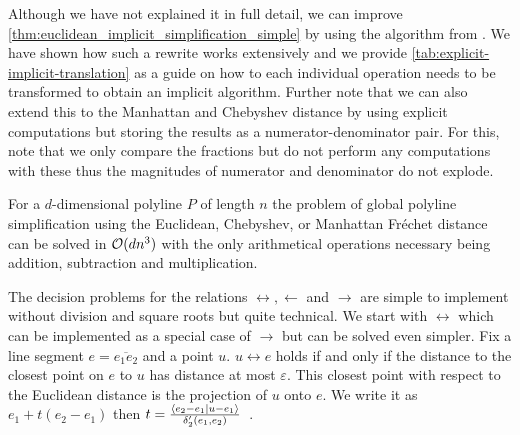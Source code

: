 Although we have not explained it in full detail, we can improve \cref{thm:euclidean_implicit_simplification_simple} by using the algorithm from \citeauthor{polyline_simplification_has_cubic_complexity_bringmannetal}. We have shown how such a rewrite works extensively and we provide \cref{tab:explicit-implicit-translation} as a guide on how to each individual operation needs to be transformed to obtain an implicit algorithm.  
Further note that we can also extend this to the Manhattan and Chebyshev distance by using explicit computations but storing the results as a numerator-denominator pair. For this, note that we only compare the fractions but do not perform any computations with these thus the magnitudes of numerator and denominator do not explode.

\begin{theorem}\label{thm:euclidean_implicit_simplification_advanced}
  For a \(d\)-dimensional polyline \(P\) of length \(n\) the problem of global polyline simplification using the Euclidean, Chebyshev, or Manhattan Fréchet distance can be solved in \(\mathcal{O}(d n^3)\) with the only arithmetical operations necessary being addition, subtraction and multiplication.
\end{theorem}

The decision problems for the relations \(\leftrightarrow, \leftarrow\) and \(\rightarrow\) are simple to implement without division and square roots but quite technical. We start with \(\leftrightarrow\) which can be implemented as a special case of \(\rightarrow\) but can be solved even simpler. Fix a line segment \(e = \overline{e_1e_2}\) and a point \(u\). \(u \leftrightarrow e\) holds if and only if the distance to the closest point on \(e\) to \(u\) has distance at most \(\varepsilon\). This closest point with respect to the Euclidean distance is the projection of \(u\) onto \(e\). We write it as \(e_1 + t(e_2 - e_1)\) then \(t = \frac{\braket{e_2 - e_1 | u - e_1}}{\delta_2'(e_1, e_2)}\)~\cite{linear_algebra}. 

